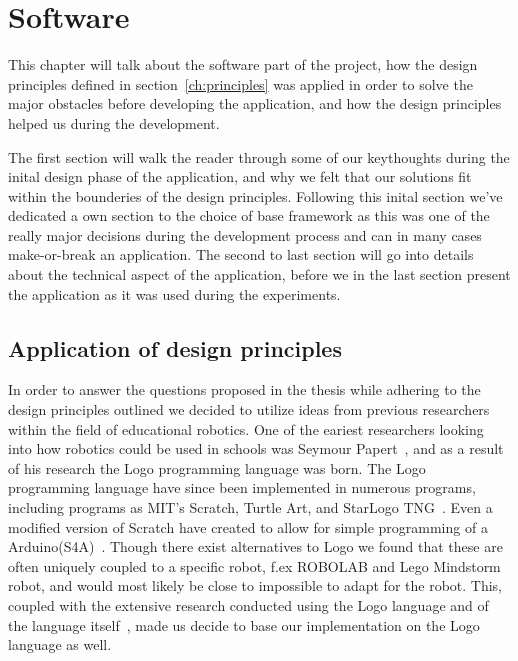 \section{Software}\label{ch:software}
This chapter will talk about the software part of the project, how the design principles defined in section~\ref{ch:principles} was applied in order to solve the major obstacles before developing the application, and how the design principles helped us during the development. 

\bigskip\noindent
The first section will walk the reader through some of our keythoughts during the inital design phase of the application, and why we felt that our solutions fit within the bounderies of the design principles. 
Following this inital section we've dedicated a own section to the choice of base framework as this was one of the really major decisions during the development process and can in many cases make-or-break an application.
The second to last section will go into details about the technical aspect of the application, before we in the last section present the application as it was used during the experiments.

\subsection*{Application of design principles}
In order to answer the questions proposed in the thesis while adhering to the design principles outlined we decided to utilize ideas from previous researchers within the field of educational robotics. 
One of the eariest researchers looking into how robotics could be used in schools was Seymour Papert~\cite{papert1980mindstorms}, and as a result of his research the Logo programming language was born. 
The Logo programming language have since been implemented in numerous programs, including programs as MIT's Scratch, Turtle Art, and StarLogo TNG~\cite{logoHomepage}. Even a modified version of Scratch have created to allow for simple programming of a Arduino(S4A)~\cite{logoForArduino}. Though there exist alternatives to Logo we found that these are often uniquely coupled to a specific robot, f.ex ROBOLAB and Lego Mindstorm robot, and would most likely be close to impossible to adapt for the \chirp robot. 
This, coupled with the extensive research conducted using the Logo language and of the language itself~\cite{clements1990effects,clements1993research,clements1996development,clements2001logo,papert1980mindstorms}, made us decide to base our implementation on the Logo language as well. 

